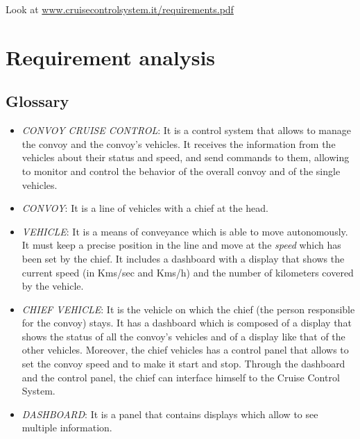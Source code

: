 \documentclass{llncs}
\newcommand{\labelsec}[1]{\label{sec:#1}}
\begin{document}
Look at \url{www.cruisecontrolsystem.it/requirements.pdf}

\section{Requirement analysis}
\labelsec{ReqAnalysis}



\subsection{Glossary}
\begin{itemize}
  \item \emph{CONVOY CRUISE CONTROL}: It is a control system that allows to manage the convoy and the convoy's vehicles. It receives the information from the vehicles about their status and speed, and send commands to them, allowing to monitor and control the behavior of the overall convoy and of the single vehicles.\\

  \item \emph{CONVOY}: It is a line of vehicles with a chief at the head.\\

  \item \emph{VEHICLE}: It is a means of conveyance which is able to move autonomously. It must keep a precise position in the line and move at the \emph{speed} which has been set by the chief. It includes a dashboard with a display that shows the current speed (in Kms/sec and Kms/h) and the number of kilometers covered by the vehicle.\\

  \item \emph{CHIEF VEHICLE}: It is the vehicle on which the chief (the person responsible for the convoy) stays. It has a dashboard which is composed of a display that shows the status of all the convoy's vehicles and of a display like that of the other vehicles. Moreover, the chief vehicles has a control panel that allows to set the convoy speed and to make it start and stop. Through the dashboard and the control panel, the chief can interface himself to the Cruise Control System. \\

  \item \emph{DASHBOARD}: It is a panel that contains displays which allow to see multiple information. \\


\end{itemize}
\end{document}
